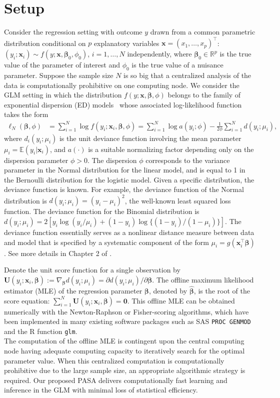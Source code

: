 \documentclass[12pt]{article}
\newcommand{\bU}{\boldsymbol{U}}
\newcommand{\bx}{\boldsymbol{x}}
\newcommand{\bbeta}{\boldsymbol{\beta}}
\begin{document}
\section{Setup}
\label{sec:setup}
Consider the regression setting with outcome $y$ drawn from a common parametric distribution conditional on $p$ explanatory variables $\bx =(x_1,\ldots, x_p)^\top$: $(y_i;\bx_i)\sim f(y;\bx,\bbeta_0,\phi_0)$, $i=1,\dots,N$ independently, where $\bbeta_0\in\mathbb{R}^p$ is the true value of the parameter of interest and $\phi_0$ is the true value of a nuisance parameter. Suppose the sample size $N$ is so big that a centralized analysis of the data is computationally prohibitive on one computing node. We consider the GLM setting in which the distribution $f(y; \bx, \bbeta, \phi)$ belongs to the family of exponential dispersion (ED) models~\cite{Jorgensen1997} whose associated log-likelihood function takes the form
\begin{align*}
\label{eq:ED_model}
\ell_{N}(\bbeta,\phi)
&=\sum_{i=1}^{N}\log f(y_i;\bx_i,\bbeta,\phi) = \sum_{i=1}^N \log a(y_i;\phi) - \frac{1}{2\phi}\sum_{i=1}^N d(y_i;\mu_i),
\end{align*}
where $d_i(y_i;\mu_i)$ is the unit deviance function involving the mean parameter $\mu_i=\mathbb{E}(y_i \rvert \bx_i)$, and $a(\cdot)$ is a suitable normalizing factor depending only on the dispersion parameter $\phi>0$. The dispersion $\phi$ corresponds to the variance parameter in the Normal distribution for the linear model, and is equal to 1 in the Bernoulli distribution for the logistic model. Given a specific distribution, the deviance function is known. For example, the deviance function of the Normal distribution is $d(y_i; \mu_i) = (y_i - \mu_i)^2$, the well-known least squared loss function. The deviance function for the Binomial distribution is $d(y_i;\mu_i) = 2[ y_i\log(y_i/\mu_i) + (1-y_i) \log\{ (1-y_i)/(1-\mu_i) \} ]$. The deviance function essentially serves as a nonlinear distance measure between data and model that is specified by a systematic component of the form $\mu_i=g(\bx_i^\top\bbeta)$. See more details in Chapter 2 of \cite{Song}.

Denote the unit score function for a single observation by $\bU(y_i;\bx_i,\bbeta):= \nabla_{\bbeta}d(y_i;\mu_i) = \partial d(y_i;\mu_i)/\partial \bbeta$. The offline maximum likelihood estimator (MLE) of the regression parameter $\bbeta$, denoted by $\widehat{\bbeta}$, is the root of the score equation:  $\sum_{i=1}^N \bU(y_i;\bx_i,\bbeta) = \bm{0}$. This offline MLE can be obtained numerically with the Newton-Raphson or Fisher-scoring algorithms, which have been implemented in many existing software packages such as SAS \texttt{PROC GENMOD} and the R function \texttt{glm}.\\
The computation of the offline MLE is contingent upon the central computing node having adequate computing capacity to iteratively search for the optimal parameter value. When this centralized computation is computationally prohibitive due to the large sample size, an appropriate algorithmic strategy is required. Our proposed PASA delivers computationally fast learning and inference in the GLM with minimal loss of statistical efficiency.
\end{document}
